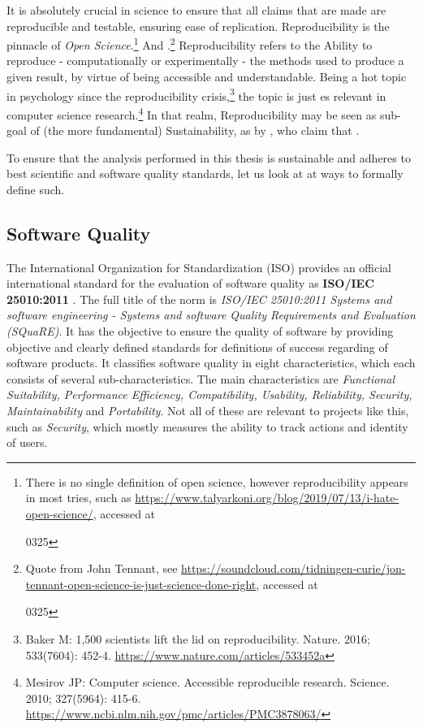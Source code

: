 It is absolutely crucial in science to ensure that all claims that are made are reproducible and testable, ensuring ease of replication. Reproducibility is the pinnacle of \textit{Open Science}.\footnote{There is no single definition of open science, however reproducibility appears in most tries, such as \eg \url{https://www.talyarkoni.org/blog/2019/07/13/i-hate-open-science/}, accessed at \date{2022}{03}{25}} And .\footnote{Quote from John Tennant, see \eg \url{https://soundcloud.com/tidningen-curie/jon-tennant-open-science-is-just-science-done-right}, accessed at \date{2022}{03}{25}} Reproducibility refers to the Ability to reproduce - computationally or experimentally - the methods used to produce a given result, by virtue of being accessible and understandable. Being a hot topic in psychology since the reproducibility crisis,\footnote{Baker M: 1,500 scientists lift the lid on reproducibility. Nature. 2016; 533(7604): 452-4. \url{https://www.nature.com/articles/533452a}} the topic is just es relevant in computer science research.\footnote{Mesirov JP: Computer science. Accessible reproducible research. Science. 2010; 327(5964): 415-6. \url{https://www.ncbi.nlm.nih.gov/pmc/articles/PMC3878063/}} In that realm, Reproducibility may be seen as sub-goal of (the more fundamental) Sustainability, as \eg by \textcite{Molder2021a}, who claim that .

To ensure that the analysis performed in this thesis is sustainable and adheres to best scientific and software quality standards, let us look at at ways to formally define such.

\subsection{Software Quality}
\label{sec:reproducibility}

The International Organization for Standardization (ISO) provides an official international standard for the evaluation of software quality as \textbf{ISO/IEC 25010:2011} \cite{2013ISOI}. The full title of the norm is \textit{ISO/IEC 25010:2011 Systems and software engineering - Systems and software Quality Requirements and Evaluation (SQuaRE)}. It has the objective to ensure the quality of software by providing objective and clearly defined standards for definitions of success regarding of software products. It classifies software quality in eight characteristics, which each consists of several sub-characteristics. The main characteristics are \textit{Functional Suitability, Performance Efficiency, Compatibility, Usability, Reliability, Security, Maintainability} and \textit{Portability}. Not all of these are relevant to projects like this, such as \textit{Security}, which mostly measures the ability to track actions and identity of users. 

